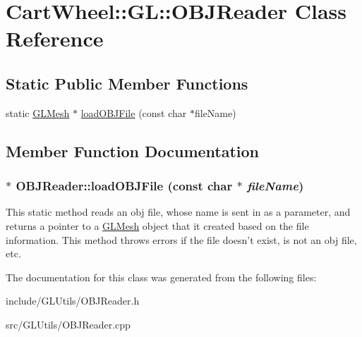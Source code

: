 \hypertarget{classCartWheel_1_1GL_1_1OBJReader}{
\section{CartWheel::GL::OBJReader Class Reference}
\label{classCartWheel_1_1GL_1_1OBJReader}
}
\subsection*{Static Public Member Functions}
\begin{DoxyCompactItemize}
\item 
static \hyperlink{classCartWheel_1_1GL_1_1GLMesh}{GLMesh} $\ast$ \hyperlink{classCartWheel_1_1GL_1_1OBJReader_a6fada47eee721f0c1b4a9160e5de6879}{loadOBJFile} (const char $\ast$fileName)
\end{DoxyCompactItemize}


\subsection{Member Function Documentation}
\hypertarget{classCartWheel_1_1GL_1_1OBJReader_a6fada47eee721f0c1b4a9160e5de6879}{
\subsubsection[{loadOBJFile}]{ $\ast$ OBJReader::loadOBJFile (const char $\ast$ {\em fileName})}}
\label{classCartWheel_1_1GL_1_1OBJReader_a6fada47eee721f0c1b4a9160e5de6879}
This static method reads an obj file, whose name is sent in as a parameter, and returns a pointer to a \hyperlink{classCartWheel_1_1GL_1_1GLMesh}{GLMesh} object that it created based on the file information. This method throws errors if the file doesn't exist, is not an obj file, etc. 

The documentation for this class was generated from the following files:\begin{DoxyCompactItemize}
\item 
include/GLUtils/OBJReader.h\item 
src/GLUtils/OBJReader.cpp\end{DoxyCompactItemize}
